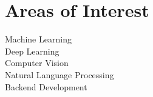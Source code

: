 \section{Areas of Interest} 
Machine Learning \\
Deep Learning \\
Computer Vision \\
Natural Language Processing \\
Backend Development
